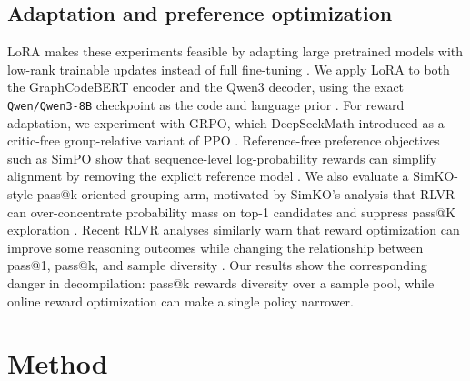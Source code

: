 \documentclass[11pt]{article}
\begin{document}
\subsection{Adaptation and preference optimization}

LoRA makes these experiments feasible by adapting large pretrained models with low-rank trainable updates instead of full fine-tuning \cite{hu2021lora}. We apply LoRA to both the GraphCodeBERT encoder and the Qwen3 decoder, using the exact \texttt{Qwen/Qwen3-8B} checkpoint as the code and language prior \cite{yang2025qwen3}. For reward adaptation, we experiment with GRPO, which DeepSeekMath introduced as a critic-free group-relative variant of PPO \cite{shao2024deepseekmath}. Reference-free preference objectives such as SimPO show that sequence-level log-probability rewards can simplify alignment by removing the explicit reference model \cite{meng2024simpo}. We also evaluate a SimKO-style pass@k-oriented grouping arm, motivated by SimKO's analysis that RLVR can over-concentrate probability mass on top-1 candidates and suppress pass@K exploration \cite{peng2025simko}. Recent RLVR analyses similarly warn that reward optimization can improve some reasoning outcomes while changing the relationship between pass@1, pass@k, and sample diversity \cite{yue2025rlvr}. Our results show the corresponding danger in decompilation: pass@k rewards diversity over a sample pool, while online reward optimization can make a single policy narrower.

\section{Method}
\end{document}
